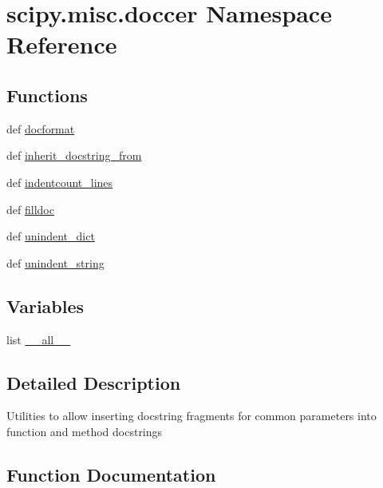 \hypertarget{namespacescipy_1_1misc_1_1doccer}{}\section{scipy.\+misc.\+doccer Namespace Reference}
\label{namespacescipy_1_1misc_1_1doccer}
\subsection*{Functions}
\begin{DoxyCompactItemize}
\item 
def \hyperlink{namespacescipy_1_1misc_1_1doccer_a8d091f879679fa1d8648ef5231c42961}{docformat}
\item 
def \hyperlink{namespacescipy_1_1misc_1_1doccer_a5f04301d6e2d846bd86a353f957fe4af}{inherit\+\_\+docstring\+\_\+from}
\item 
def \hyperlink{namespacescipy_1_1misc_1_1doccer_ad97d0200733a3cb7b3c005c1abd4c488}{indentcount\+\_\+lines}
\item 
def \hyperlink{namespacescipy_1_1misc_1_1doccer_a0e2cf7d01b93ddb7829f5e605cc9c464}{filldoc}
\item 
def \hyperlink{namespacescipy_1_1misc_1_1doccer_a57e4e454c156717bee93f3ecc68bcf95}{unindent\+\_\+dict}
\item 
def \hyperlink{namespacescipy_1_1misc_1_1doccer_a4914cb50788bd26cb30f0beb251e595e}{unindent\+\_\+string}
\end{DoxyCompactItemize}
\subsection*{Variables}
\begin{DoxyCompactItemize}
\item 
list \hyperlink{namespacescipy_1_1misc_1_1doccer_a332eb15e8eea310779e28856de4e8c72}{\+\_\+\+\_\+all\+\_\+\+\_\+}
\end{DoxyCompactItemize}


\subsection{Detailed Description}
\begin{DoxyVerb}Utilities to allow inserting docstring fragments for common
parameters into function and method docstrings\end{DoxyVerb}
 

\subsection{Function Documentation}
\hypertarget{namespacescipy_1_1misc_1_1doccer_a8d091f879679fa1d8648ef5231c42961}{}
